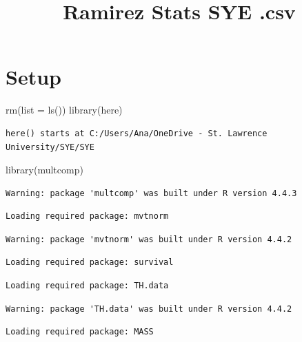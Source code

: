\documentclass[
  letterpaper,
  DIV=11,
  numbers=noendperiod]{scrartcl}
\title{Ramirez Stats SYE .csv}
\author{}
\date{}
\newenvironment{Shaded}{\begin{snugshade}}{\end{snugshade}}
\newcommand{\AttributeTok}[1]{\textcolor[rgb]{0.40,0.45,0.13}{#1}}
\newcommand{\FunctionTok}[1]{\textcolor[rgb]{0.28,0.35,0.67}{#1}}
\newcommand{\NormalTok}[1]{\textcolor[rgb]{0.00,0.23,0.31}{#1}}
\begin{document}
\maketitle


\section{Setup}\label{setup}

\begin{Shaded}
\begin{Highlighting}[]
\FunctionTok{rm}\NormalTok{(}\AttributeTok{list =} \FunctionTok{ls}\NormalTok{())}
\FunctionTok{library}\NormalTok{(here)}
\end{Highlighting}
\end{Shaded}

\begin{verbatim}
here() starts at C:/Users/Ana/OneDrive - St. Lawrence University/SYE/SYE
\end{verbatim}

\begin{Shaded}
\begin{Highlighting}[]
\FunctionTok{library}\NormalTok{(multcomp)}
\end{Highlighting}
\end{Shaded}

\begin{verbatim}
Warning: package 'multcomp' was built under R version 4.4.3
\end{verbatim}

\begin{verbatim}
Loading required package: mvtnorm
\end{verbatim}

\begin{verbatim}
Warning: package 'mvtnorm' was built under R version 4.4.2
\end{verbatim}

\begin{verbatim}
Loading required package: survival
\end{verbatim}

\begin{verbatim}
Loading required package: TH.data
\end{verbatim}

\begin{verbatim}
Warning: package 'TH.data' was built under R version 4.4.2
\end{verbatim}

\begin{verbatim}
Loading required package: MASS
\end{verbatim}
\end{document}
